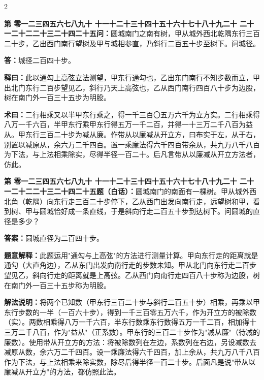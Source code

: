 \documentclass[10pt,a4paper]{article}
\newcounter{probnum}
\newcounter{probnumvol}[section]
\newcommand{\chnum}[1]{%
  \ifcase#1 零\or 一\or 二\or 三\or 四\or 五\or 六\or 七\or 八\or 九\or 十\or
    十一\or 十二\or 十三\or 十四\or 十五\or 十六\or 十七\or 十八\or 十九\or 二十\or
    二十一\or 二十二\or 二十三\or 二十四\or 二十五\fi}
\newcommand{\problemclassical}[1]{%
  \stepcounter{probnumvol}%
  \par\noindent
  \textcolor{classicalcolor}{\textbf{第\chnum{\value{probnumvol}}问：}}#1\par\smallskip
}
\newcommand{\problemmodern}[1]{%
  \par\noindent
  \textcolor{moderncolor}{\textbf{第\chnum{\value{probnumvol}}题（白话）：}}#1\par\smallskip
}
\newcommand{\answerclassical}[1]{%
  \par\noindent\textcolor{classicalcolor}{\textbf{答：}}#1\par
}
\newcommand{\answermodern}[1]{%
  \par\noindent\textcolor{moderncolor}{\textbf{答案：}}#1\par
}
\newcommand{\shiyiclassical}[1]{%
  \par\noindent\textcolor{classicalcolor}{\textbf{释曰：}}#1\par
}
\newcommand{\shiyimodern}[1]{%
  \par\noindent\textcolor{moderncolor}{\textbf{题意解释：}}#1\par
}
\newcommand{\shuyueclassical}[1]{%
  \par\noindent\textcolor{classicalcolor}{\textbf{术曰：}}#1\par
}
\newcommand{\shuyuemodern}[1]{%
  \par\noindent\textcolor{moderncolor}{\textbf{解法说明：}}#1\par
}
\begin{document}
\begin{paracol}{2}

\problemclassical{圆城南门之南有树，甲从城外西北乾隅东行三百二十步，乙出西门南行望树及甲与城相参直，乃斜行二百五十步至树下。问城径。}

\answerclassical{城径二百四十步。}

\shiyiclassical{此以通勾上高弦立法测望，甲东行通勾也，乙出东门南行不知步数而立，甲出北门东行二百步望见乙，斜行乃天上高弦也，乙从西门南行四百八十步为边股，树在南门外一百三十五步为明股。}

\shuyueclassical{二行相乘又以半甲东行乘之，得一千三百〇五万六千为立方实。二行相乘得八万一千六百，半甲东行乘甲东行得五万一千二百，并得一十三万二千八百为益从。甲东行三百二十步为减从廉。作带从以廉减从开立方，曰布实于左，从于右，别置以减原从，余六万二千四百。置一乘廉法得六千四百带余从，共九万八千八百为下法，与上法相乘除实，尽得半径一百二十。后凡言带从以廉减从开立方法者，仿此。}

\switchcolumn

\problemmodern{圆城南门的南面有一棵树。甲从城外西北角（乾隅）向东行走三百二十步停下，乙从西门出发向南行走，远望树和甲，看到树、甲与圆城恰好成一条直线，于是斜向行走二百五十步到达树下。问圆城的直径是多少？}

\answermodern{圆城直径为二百四十步。}

\shiyimodern{此题运用"通勾与上高弦"的方法进行测量计算。甲向东行走的距离就是通勾（大直角边），乙从东门出发向南行走的步数未知。甲从北门向东行走二百步望见乙，斜向行走的距离就是上高弦。乙从西门向南行走四百八十步称为边股，树在南门外一百三十五步称为明股。}

\shuyuemodern{将两个已知数（甲东行三百二十步与斜行二百五十步）相乘，再乘以甲东行步数的一半（一百六十步），得到一千三百零五万六千，作为开立方的被除数（实）。两数相乘得八万一千六百，半东行数乘东行数得五万一千二百，相加得十三万二千八百，作为"益从"（正系数）。甲东行的三百二十步作为"减从廉"（待减的廉数）。使用带从开立方的方法：将被除数列在左边，系数列在右边，另设减数去减原从数，余六万二千四百。设一乘廉法得六千四百，加上余从，共九万八千八百作为下法，与上法相乘来除实数，除尽后得半径一百二十步。后面凡是说"带从以廉减从开立方"的方法，都仿照此法。}

\end{paracol}

\vspace{0.3cm}
\end{document}
